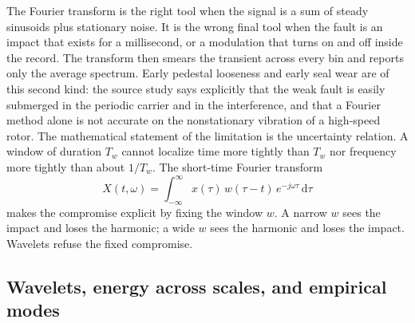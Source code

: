 The Fourier transform is the right tool when the signal is a sum of steady sinusoids plus stationary noise.
It is the wrong final tool when the fault is an impact that exists for a millisecond, or a modulation that turns on and off inside the record.
The transform then smears the transient across every bin and reports only the average spectrum.
Early pedestal looseness and early seal wear are of this second kind: the source study says explicitly that the weak fault is easily submerged in the periodic carrier and in the interference, and that a Fourier method alone is not accurate on the nonstationary vibration of a high-speed rotor.
The mathematical statement of the limitation is the uncertainty relation.
A window of duration \(T_{w}\) cannot localize time more tightly than \(T_{w}\) nor frequency more tightly than about \(1/T_{w}\).
The short-time Fourier transform
\begin{equation}
X(t,\omega)=\int_{-\infty}^{\infty} x(\tau)\,w(\tau-t)\,e^{-j\omega\tau}\,\mathrm{d}\tau
\label{eq:stft}
\end{equation}
makes the compromise explicit by fixing the window \(w\).
A narrow \(w\) sees the impact and loses the harmonic; a wide \(w\) sees the harmonic and loses the impact.
Wavelets refuse the fixed compromise.

\subsection{Wavelets, energy across scales, and empirical modes}

